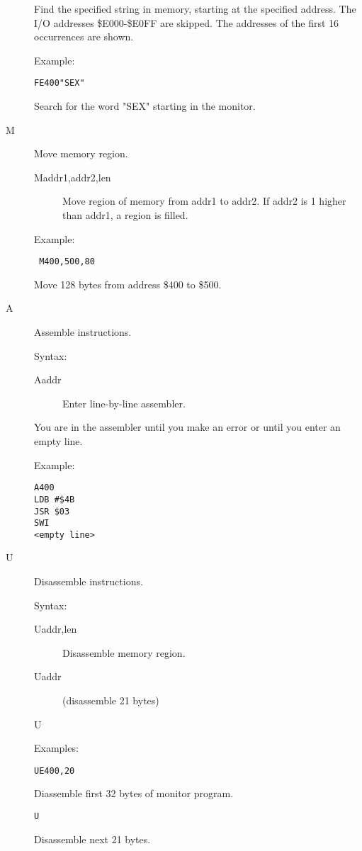 \begin{description}
Find the specified string in memory, starting at the specified address. The
I/O addresses \$E000-\$E0FF are skipped. The addresses of the first 16
occurrences are shown.

Example:
\begin{verbatim}
FE400"SEX"
\end{verbatim}
Search for the word "SEX" starting in the monitor.

\item[M] Move memory region.

\begin{description}
\item[Maddr1,addr2,len] Move region of memory from addr1 to addr2. If addr2 is
                 1 higher than addr1, a region is filled. 
\end{description}

Example:
\begin{verbatim}
 M400,500,80
\end{verbatim}
Move 128 bytes from address \$400 to \$500.

\item[A] Assemble instructions.

Syntax:
\begin{description}
\item[Aaddr]      Enter line-by-line assembler.
\end{description}

You are in the assembler until you make an error or until you enter an empty
line.

Example:
\begin{verbatim}
A400
LDB #$4B
JSR $03
SWI
<empty line>
\end{verbatim}

\item[U] Disassemble instructions.

Syntax:
\begin{description}
\item[Uaddr,len]  Disassemble memory region.
\item[Uaddr]      (disassemble 21 bytes)
\item[U]          
\end{description}

Examples:
\begin{verbatim}
UE400,20
\end{verbatim}
Diassemble first 32 bytes of monitor program.
\begin{verbatim}
U
\end{verbatim}
Disassemble next 21 bytes.


\end{description}
